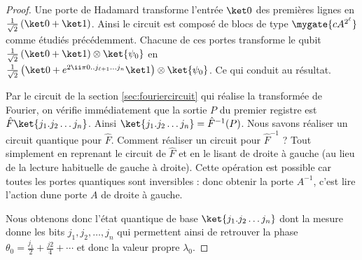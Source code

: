 \documentclass[11pt,class=report,crop=false]{standalone}
\begin{document}
\begin{proof}
Une porte de Hadamard  transforme l'entrée $\ket0$ des premières lignes en 
$\frac{1}{\sqrt2}\left(\ket0+\ket1\right)$.
Ainsi le circuit est composé de blocs de type $\mygate{cA^{2^\ell}}$ comme étudiés précédemment.
Chacune de ces portes transforme le qubit $\frac{1}{\sqrt2}\left(\ket0+\ket1\right) \otimes \ket{\psi_0}$
en $\frac{1}{\sqrt2}\left(\ket0+ e^{2\ii\pi 0..j_{\ell+1} \ldots j_n}\ket1\right) \otimes \ket{\psi_0}$. Ce qui conduit au résultat.

Par le circuit de la section \ref{sec:fouriercircuit} qui réalise la transformée de Fourier, on vérifie immédiatement que la sortie $P$ du premier registre est $\hat F\ket{j_1.j_2\ldots j_n}$.
Ainsi
$\ket{j_1.j_2\ldots j_n} = \hat F^{-1}(P)$.  
Nous savons réaliser un circuit quantique pour $\hat F$. Comment réaliser un circuit pour $\hat F^{-1}$ ? Tout simplement en reprenant le circuit de $\hat F$ et en le lisant de droite à gauche (au lieu de la lecture habituelle de gauche à droite). Cette opération est possible car toutes les portes quantiques sont inversibles : donc obtenir la porte $A^{-1}$, c'est lire l'action dune porte $A$ de droite à gauche.

Nous obtenons donc l'état quantique de base $\ket{j_1.j_2\ldots j_n}$ dont la mesure donne les bits $j_1,j_2,\ldots,j_n$ qui permettent ainsi de retrouver la phase $\theta_0
= \frac{j_1}{2}+\frac{j2}{4}+\cdots$ et donc la valeur propre $\lambda_0$.
\end{proof}
\end{document}
